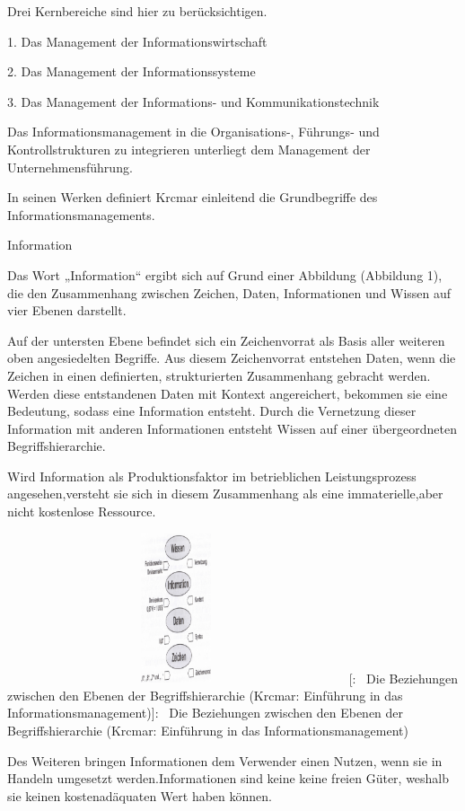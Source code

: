 \documentclass{article}
\begin{document}
Drei Kernbereiche sind hier zu berücksichtigen.

1. Das Management der Informationswirtschaft

2. Das Management der Informationssysteme

3. Das Management der Informations- und Kommunikationstechnik

Das Informationsmanagement in die Organisations-, Führungs- und Kontrollstrukturen zu integrieren unterliegt dem
Management der Unternehmensführung.

In seinen Werken definiert Krcmar einleitend die Grundbegriffe des Informationsmanagements.


\bigskip

Information 

Das Wort „Information“ ergibt sich auf Grund einer Abbildung (Abbildung 1), die den Zusammenhang zwischen Zeichen,
Daten, Informationen und Wissen auf vier Ebenen darstellt.

Auf der untersten Ebene befindet sich ein Zeichenvorrat als Basis aller weiteren oben angesiedelten Begriffe. \newline
Aus diesem Zeichenvorrat entstehen Daten, wenn die Zeichen in einen definierten, strukturierten Zusammenhang gebracht
werden.\newline
Werden diese entstandenen Daten mit Kontext angereichert, bekommen sie eine Bedeutung, sodass eine Information entsteht.
\newline
Durch die Vernetzung dieser Information mit anderen Informationen entsteht Wissen auf einer übergeordneten
Begriffshierarchie.\newline


Wird Information als Produktionsfaktor im betrieblichen Leistungsprozess angesehen,versteht sie sich in diesem
Zusammenhang als eine immaterielle,aber nicht kostenlose Ressource.

\begin{center}
\includegraphics[width=9.948cm,height=4.406cm]{ErsterEntwurfderHausarbeitAlina-img/ErsterEntwurfderHausarbeitAlina-img001.pdf}
[: \ Die Beziehungen zwischen den Ebenen der Begriffshierarchie (Krcmar: Einführung in das
Informationsmanagement)]{: \ Die Beziehungen zwischen den Ebenen der Begriffshierarchie (Krcmar: Einführung in das
Informationsmanagement)}

\end{center}
Des Weiteren bringen Informationen dem Verwender einen Nutzen, wenn sie in Handeln umgesetzt werden.Informationen sind
keine keine freien Güter, weshalb sie keinen kostenadäquaten Wert haben können.
\end{document}
